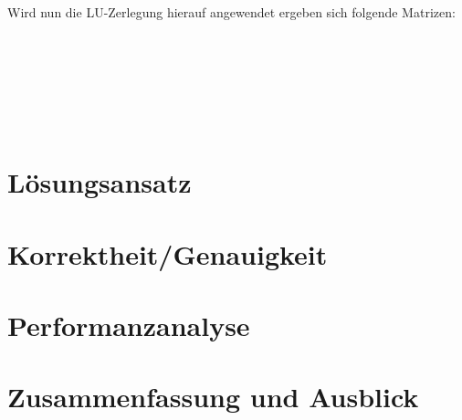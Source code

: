 \documentclass[course=erap]{aspdoc}
\begin{document}
\noindent\hspace*{15mm}%
Wird nun die LU-Zerlegung hierauf angewendet ergeben sich folgende Matrizen:
\\\\\\\\\\\\\\



\section{Lösungsansatz}


\section{Korrektheit/Genauigkeit}


\section{Performanzanalyse}


\section{Zusammenfassung und Ausblick}


{}
\end{document}
